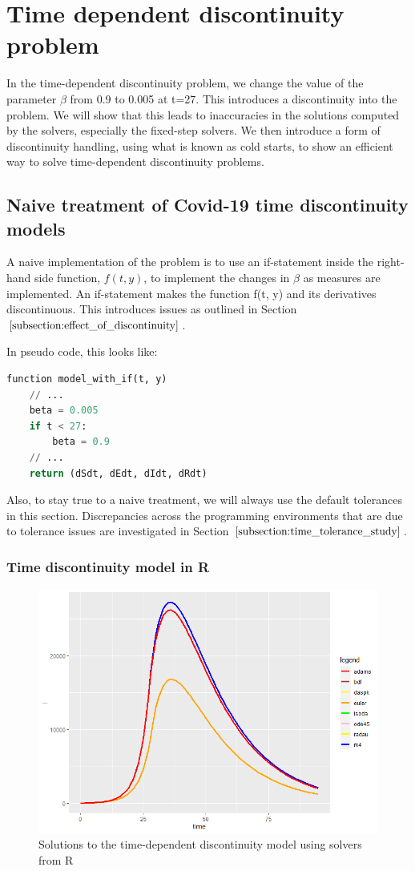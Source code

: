 \section{Time dependent discontinuity problem}
\label{section:time_problem}
In the time-dependent discontinuity problem, we change the value of the parameter $\beta$ from 0.9 to 0.005 at t=27. This introduces a discontinuity into the problem. We will show that this leads to inaccuracies in the solutions computed by the solvers, especially the fixed-step solvers. We then introduce a form of discontinuity handling, using what is known as cold starts, to show an efficient way to solve time-dependent discontinuity problems.

\subsection{Naive treatment of Covid-19 time discontinuity models}
\label{subsection:naive_time_problem}
A naive implementation of the problem is to use an if-statement inside the right-hand side function, $f(t, y)$, to implement the changes in $\beta$ as measures are implemented. An if-statement makes the function f(t, y) and its derivatives discontinuous. This introduces issues as outlined in Section $\ref{subsection:effect_of_discontinuity}$.

In pseudo code, this looks like:

\begin{minipage}{\linewidth}
\begin{lstlisting}[language=Python]
function model_with_if(t, y)
    // ...
    beta = 0.005
    if t < 27:
        beta = 0.9
    // ...
    return (dSdt, dEdt, dIdt, dRdt)
\end{lstlisting}
\end{minipage}

Also, to stay true to a naive treatment, we will always use the default tolerances in this section. Discrepancies across the programming environments that are due to tolerance issues are investigated in Section $\ref{subsection:time_tolerance_study}$.
\subsubsection{Time discontinuity model in R}

\begin{figure}[H]
\centering
\includegraphics[width=0.7\linewidth]{./figures/time_discontinuity_R}
\caption{Solutions to the time-dependent discontinuity model using solvers from R}
\label{fig:time_discontinuity_R}
\end{figure}

